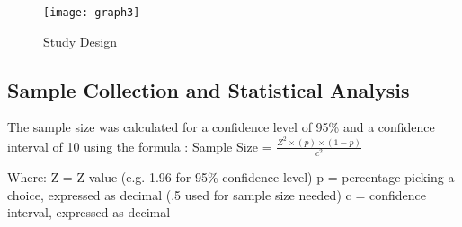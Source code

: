 \begin{figure}[h!]
	\centering
	\texttt{[image: graph3]}
	\caption{Study Design}	
	\label{fig:studydesign}	
\end{figure}
 


\subsection{Sample Collection and Statistical Analysis}

The sample size was calculated for a confidence level of 95\% and a confidence interval of 10 using the formula \cite{SampleSize2015}: 
Sample Size =	$\frac{Z^2 \times (p) \times (1-p)}{c^2}$


Where:
Z = Z value (e.g. 1.96 for 95\% confidence level) 
p = percentage picking a choice, expressed as decimal (.5 used for sample size needed)
c = confidence interval, expressed as decimal 

